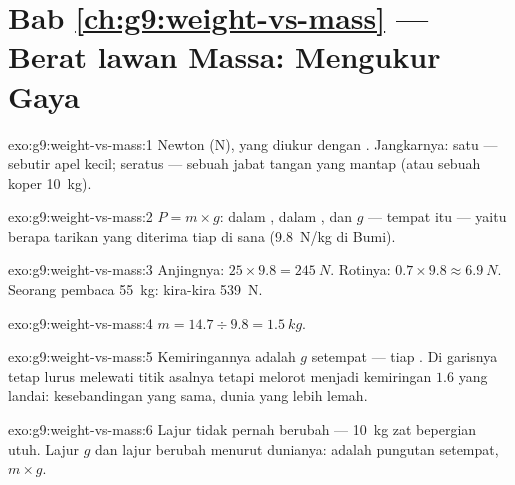 \section*{Bab \ref{ch:g9:weight-vs-mass} --- Berat lawan Massa: Mengukur Gaya}

\begin{solution}{exo:g9:weight-vs-mass:1}
Newton (\unit{N}), yang diukur dengan . Jangkarnya: satu
 ---  sebutir apel kecil; seratus --- sebuah jabat tangan
yang mantap (atau  sebuah koper \qty{10}{kg}).
\end{solution}

\begin{solution}{exo:g9:weight-vs-mass:2}
$P = m \times g$:  dalam ,  dalam , dan
$g$ ---  tempat itu --- yaitu berapa  tarikan yang
diterima tiap  di sana (\qty{9.8}{N/kg} di Bumi).
\end{solution}

\begin{solution}{exo:g9:weight-vs-mass:3}
Anjingnya: $25 \times 9.8 = \qty{245}{N}$. Rotinya: $0.7 \times 9.8
\approx \qty{6.9}{N}$. Seorang pembaca \qty{55}{kg}: kira-kira
\qty{539}{N}.
\end{solution}

\begin{solution}{exo:g9:weight-vs-mass:4}
$m = 14.7 \div 9.8 = \qty{1.5}{kg}$.
\end{solution}

\begin{solution}{exo:g9:weight-vs-mass:5}
Kemiringannya adalah $g$ setempat ---  tiap . Di 
garisnya tetap lurus melewati titik asalnya tetapi melorot menjadi
kemiringan $1.6$ yang landai: kesebandingan yang sama, dunia yang
lebih lemah.
\end{solution}

\begin{solution}{exo:g9:weight-vs-mass:6}
Lajur  tidak pernah berubah --- \qty{10}{kg} zat bepergian
utuh. Lajur $g$ dan lajur  berubah menurut dunianya: 
adalah pungutan setempat, $m \times g$.
\end{solution}

